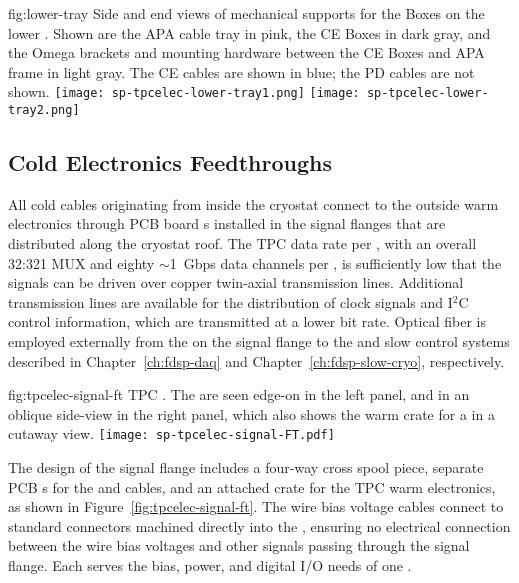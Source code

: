 \begin{dunefigure}
{fig:lower-tray}
{Side and end views of mechanical supports for the  Boxes on the lower . Shown are 
the APA cable tray in pink, the CE Boxes in dark gray, and the Omega brackets and mounting hardware 
between the CE Boxes and APA frame in light gray. The CE cables are shown in blue; the PD cables are not shown.}
\texttt{[image: sp-tpcelec-lower-tray1.png]}
\texttt{[image: sp-tpcelec-lower-tray2.png]}
\end{dunefigure}

\subsection{Cold Electronics Feedthroughs}
\label{sec:fdsp-tpcelec-design-ft}

All cold cables originating from inside the cryostat connect to the outside warm electronics through PCB board \fdth{}s
installed in the signal flanges that are distributed along the cryostat roof.
The TPC data rate per , with an overall \num{32}:\num{321} MUX and eighty $\sim$1~Gbps data channels per ,
is sufficiently low that the  signals can be driven over copper twin-axial transmission lines.
Additional transmission lines are available for the distribution of  clock signals and I$^2$C control information,
which are transmitted at a lower bit rate.
Optical fiber is employed externally from the  on the signal flange to the  and slow control systems described in Chapter~\ref{ch:fdsp-daq} and Chapter~\ref{ch:fdsp-slow-cryo}, respectively.

\begin{dunefigure}
{fig:tpcelec-signal-ft}
{TPC  \fdth. The  are seen edge-on in the left panel, and in an oblique side-view in the right panel, which also shows the warm crate for a  %
in a cutaway view.}
\texttt{[image: sp-tpcelec-signal-FT.pdf]}
\end{dunefigure}

The design of the signal flange includes a four-way cross spool piece, separate PCB \fdth{}s for the  and  cables, and
an attached crate for the TPC warm electronics, as shown in Figure~\ref{fig:tpcelec-signal-ft}.
The wire bias voltage cables connect to standard  connectors machined directly into the  \fdth,
ensuring no electrical connection between the wire bias voltages and other signals passing through the signal flange.
Each  \fdth serves the bias, power, and digital I/O needs of one .  


